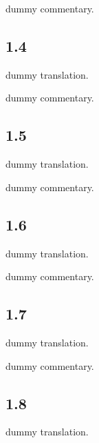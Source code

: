 \begin{ekdosis}
  \begin{philcomm}[hp01_003]          
    dummy commentary.
  \end{philcomm}


  \subsection*{1.4}
  \begin{translation}[hp01_004]
    dummy translation.
  \end{translation}
  
  \begin{philcomm}[hp01_004]          
    dummy commentary.
  \end{philcomm}



  \subsection*{1.5}
  \begin{translation}[hp01_005]
    dummy translation.
  \end{translation}
  
  \begin{philcomm}[hp01_005]          
    dummy commentary.
  \end{philcomm}


  \subsection*{1.6}
  \begin{translation}[hp01_006]
    dummy translation.
  \end{translation}
  
  \begin{philcomm}[hp01_006]          
    dummy commentary.
  \end{philcomm}



  \subsection*{1.7}
  \begin{translation}[hp01_007]
    dummy translation.
  \end{translation}
  
  \begin{philcomm}[hp01_007]          
    dummy commentary.
  \end{philcomm}


  \subsection*{1.8}
  \begin{translation}[hp01_008]
    dummy translation.
  \end{translation}
  

\end{ekdosis}
